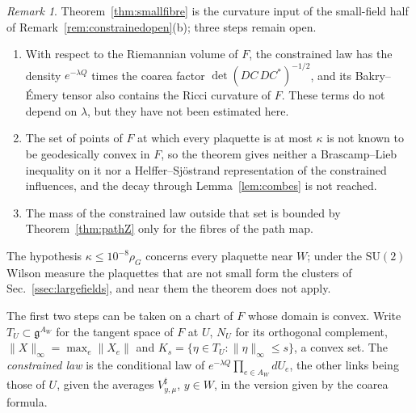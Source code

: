 \documentclass[11pt]{amsart}
\theoremstyle{definition}
\theoremstyle{remark}
\newtheorem{remark}[theorem]{Remark}
\numberwithin{equation}{section}
\newcommand{\SU}{\mathrm{SU}}
\newcommand{\g}{\mathfrak{g}}
\begin{document}
\begin{remark}\label{rem:smallfibreopen}
Theorem~\ref{thm:smallfibre} is the curvature input of the small-field half
of Remark~\ref{rem:constrainedopen}(b); three steps remain open.
\begin{enumerate}[label=\textup{(\alph*)},leftmargin=*]
\item With respect to the Riemannian volume of $F$, the constrained law
has the density $e^{-\lambda Q}$ times the coarea factor $\det(DC\,DC^*)^{-1/2}$, and its Bakry--\'Emery tensor also contains the Ricci curvature of
$F$. These terms do not depend on $\lambda$, but they have not been
estimated here.
\item The set of points of $F$ at which every plaquette is at most $\kappa$
is not known to be geodesically convex in $F$, so the theorem gives neither
a Brascamp--Lieb inequality on it nor a Helffer--Sj\"ostrand representation
of the constrained influences, and the decay through Lemma~\ref{lem:combes}
is not reached.
\item The mass of the constrained law outside that set is bounded by
Theorem~\ref{thm:pathZ} only for the fibres of the path map.
\end{enumerate}
The hypothesis $\kappa\le10^{-8}\rho_G$ concerns every plaquette near
$W$; under the $\SU(2)$ Wilson measure the plaquettes that are not small
form the clusters of Sec.~\ref{ssec:largefields}, and near them the
theorem does not apply.
\end{remark}

The first two steps can be taken on a chart of $F$ whose domain is convex.
Write $T_U\subset\g^{A_W}$ for the tangent space of $F$ at $U$, $N_U$ for its
orthogonal complement, $\lVert X\rVert_\infty=\max_e\lVert X_e\rVert$ and
$K_s=\{\eta\in T_U:\lVert\eta\rVert_\infty\le s\}$, a convex set. The
\emph{constrained law} is the conditional law of $e^{-\lambda Q}\prod_{e\in
A_W}dU_e$, the other links being those of $U$, given the averages $V^\sharp
_{y,\mu}$, $y\in W$, in the version given by the coarea formula.
\end{document}
